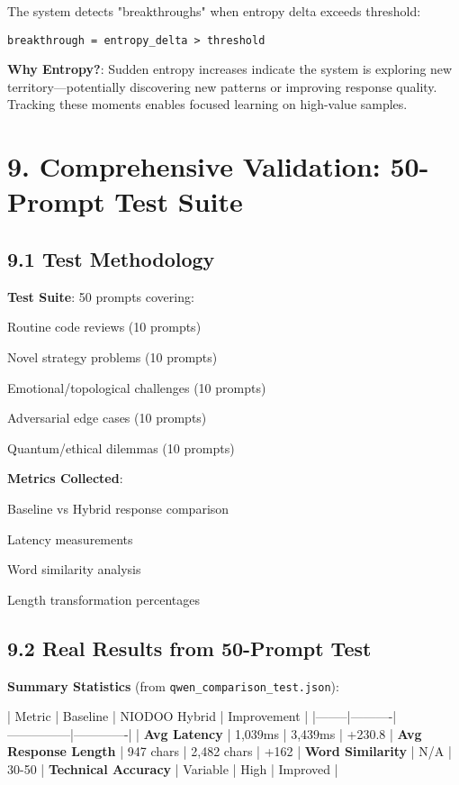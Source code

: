 \documentclass[11pt,a4paper]{article}
\begin{document}
The system detects "breakthroughs" when entropy delta exceeds threshold:

\begin{verbatim}breakthrough = entropy_delta > threshold
\end{verbatim}

\textbf{Why Entropy?}: Sudden entropy increases indicate the system is exploring new territory—potentially discovering new patterns or improving response quality. Tracking these moments enables focused learning on high-value samples.

\section{9. Comprehensive Validation: 50-Prompt Test Suite}

\subsection{9.1 Test Methodology}

\textbf{Test Suite}: 50 prompts covering:
\item Routine code reviews (10 prompts)
\item Novel strategy problems (10 prompts)
\item Emotional/topological challenges (10 prompts)
\item Adversarial edge cases (10 prompts)
\item Quantum/ethical dilemmas (10 prompts)

\textbf{Metrics Collected}:
\item Baseline vs Hybrid response comparison
\item Latency measurements
\item Word similarity analysis
\item Length transformation percentages

\subsection{9.2 Real Results from 50-Prompt Test}

\textbf{Summary Statistics} (from \texttt{qwen_comparison_test.json}):

| Metric | Baseline | NIODOO Hybrid | Improvement |
|--------|----------|---------------|-------------|
| \textbf{Avg Latency} | 1,039ms | 3,439ms | +230.8%
| \textbf{Avg Response Length} | 947 chars | 2,482 chars | +162%
| \textbf{Word Similarity} | N/A | 30-50%
| \textbf{Technical Accuracy} | Variable | High | Improved |
\end{document}

